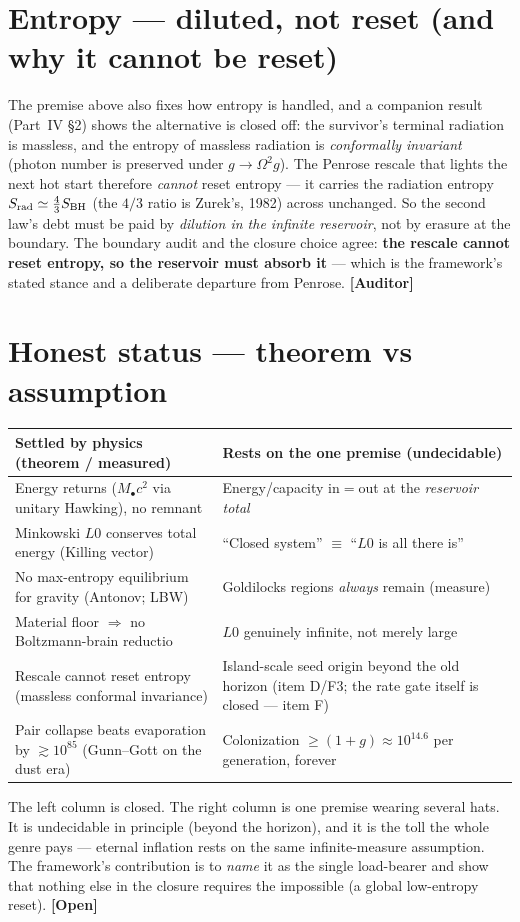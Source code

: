 \documentclass[11pt]{article}
\newcommand{\Open}{\textbf{\textcolor{gray!10!black}{[Open]}}}
\newcommand{\Auditor}{\textbf{\textcolor{teal!55!black}{[Auditor]}}}
\newcommand{\Mbh}{M_{\bullet}}
\begin{document}
\section{Entropy --- diluted, not reset (and why it cannot be reset)}
The premise above also fixes how entropy is handled, and a companion result (Part~IV \S2) shows the alternative is closed off: the survivor's terminal radiation is massless, and the entropy of massless radiation is \emph{conformally invariant} (photon number is preserved under $g\!\to\!\Omega^2 g$). The Penrose rescale that lights the next hot start therefore \emph{cannot} reset entropy --- it carries the radiation entropy $S_{\rm rad}\simeq\tfrac43 S_{\rm BH}$ (the $4/3$ ratio is Zurek's, 1982) across unchanged. So the second law's debt must be paid by \emph{dilution in the infinite reservoir}, not by erasure at the boundary. The boundary audit and the closure choice agree: \textbf{the rescale cannot reset entropy, so the reservoir must absorb it} --- which is the framework's stated stance and a deliberate departure from Penrose. \Auditor

\section{Honest status --- theorem vs assumption}
\begin{center}\small
\begin{tabular}{@{}p{}p{}@{}}
\toprule
Settled by physics (theorem / measured) & Rests on the one premise (undecidable) \\
\midrule
Energy returns ($\Mbh c^2$ via unitary Hawking), no remnant & Energy/capacity in$=$out at the \emph{reservoir total} \\
Minkowski $L0$ conserves total energy (Killing vector) & ``Closed system'' $\equiv$ ``$L0$ is all there is'' \\
No max-entropy equilibrium for gravity (Antonov; LBW) & Goldilocks regions \emph{always} remain (measure) \\
Material floor $\Rightarrow$ no Boltzmann-brain reductio & $L0$ genuinely infinite, not merely large \\
Rescale cannot reset entropy (massless conformal invariance) & Island-scale seed origin beyond the old horizon (item D/F3; the rate gate itself is closed --- item F) \\
Pair collapse beats evaporation by $\gtrsim\!10^{85}$ (Gunn--Gott on the dust era) & Colonization $\ge(1+g)\approx10^{14.6}$ per generation, forever \\
\bottomrule
\end{tabular}
\end{center}
The left column is closed. The right column is one premise wearing several hats. It is undecidable in principle (beyond the horizon), and it is the toll the whole genre pays --- eternal inflation rests on the same infinite-measure assumption. The framework's contribution is to \emph{name} it as the single load-bearer and show that nothing else in the closure requires the impossible (a global low-entropy reset). \Open
\end{document}
